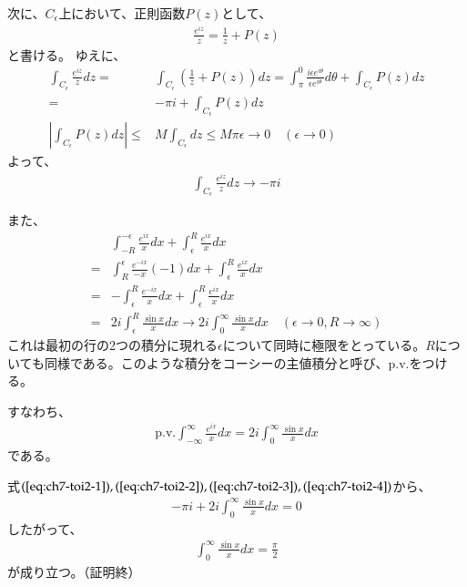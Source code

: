次に、$C_\epsilon$上において、正則函数$P(z)$として、
\begin{align*}
    \frac{e^{iz}}{z}=\frac{1}{z}+P(z)
\end{align*}
と書ける。
ゆえに、
\begin{align*}
    \int_{C_\epsilon}\frac{e^{iz}}{z}dz
    =&\int_{C_\epsilon}\left(\frac{1}{z}+P(z)\right)dz
    =\int_{\pi}^{0}\frac{i\epsilon e^{i\theta}}{\epsilon e^{i\theta}}d\theta+\int_{C_\epsilon}P(z)dz\\
    =&-\pi i+\int_{C_\epsilon}P(z)dz\\
    \left|\int_{C_\epsilon}P(z)dz\right|
    \le&M\int_{C_\epsilon}dz
    \le M\pi\epsilon\longrightarrow0
    \quad(\epsilon\longrightarrow0)
\end{align*}
よって、
\begin{align}
    \int_{C_\epsilon}\frac{e^{iz}}{z}dz
    \longrightarrow-\pi i\label{eq:ch7-toi2-3}
\end{align}

また、
\begin{align*}
    &\int_{-R}^{-\epsilon}\frac{e^{ix}}{x}dx+\int_{\epsilon}^{R}\frac{e^{ix}}{x}dx\\
    =&\int_{R}^{\epsilon}\frac{e^{-ix}}{-x}(-1)dx+\int_{\epsilon}^{R}\frac{e^{ix}}{x}dx\\
    =&-\int_{\epsilon}^{R}\frac{e^{-ix}}{x}dx+\int_{\epsilon}^{R}\frac{e^{ix}}{x}dx\\
    =&2i\int_{\epsilon}^{R}\frac{\sin x}{x}dx
    \longrightarrow
    2i\int_{0}^{\infty}\frac{\sin x}{x}dx
    \quad(\epsilon\longrightarrow0,R\longrightarrow\infty)
\end{align*}
これは最初の行の2つの積分に現れる$\epsilon$について同時に極限をとっている。$R$についても同様である。このような積分をコーシーの主値積分と呼び、$\mathrm{p.v.}$をつける。

すなわち、
\begin{align}
    \mathrm{p.v.}\int_{-\infty}^{\infty}\frac{e^{ix}}{x}dx=2i\int_{0}^{\infty}\frac{\sin x}{x}dx\label{eq:ch7-toi2-4}
\end{align}
である。

式$(\ref{eq:ch7-toi2-1}),(\ref{eq:ch7-toi2-2}),(\ref{eq:ch7-toi2-3}),(\ref{eq:ch7-toi2-4})$から、
\begin{align*}
    -\pi i+2i\int_{0}^{\infty}\frac{\sin x}{x}dx=0
\end{align*}
したがって、
\begin{align*}
    \int_{0}^{\infty}\frac{\sin x}{x}dx
    =\frac{\pi}{2}
\end{align*}
が成り立つ。（証明終）


